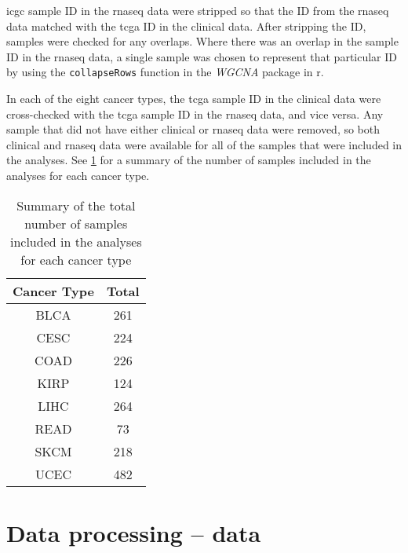 
\gls{icgc} sample ID in the \gls{rnaseq} data were stripped so that the ID from the \gls{rnaseq} data matched with the \gls{tcga} ID in the clinical data.
After stripping the ID, samples were checked for any overlaps.
Where there was an overlap in the sample ID in the \gls{rnaseq} data, a single sample was chosen to represent that particular ID by using the \texttt{collapseRows} function in the \textit{WGCNA} package in \gls{r}.

In each of the eight cancer types, the \gls{tcga} sample ID in the clinical data were cross-checked with the \gls{tcga} sample ID in the \gls{rnaseq} data, and vice versa.
Any sample that did not have either clinical or \gls{rnaseq} data were removed, so both clinical and \gls{rnaseq} data were available for all of the samples that were included in the analyses.
See \cref{tab:samplesize} for a summary of the number of samples included in the analyses for each cancer type.

\begin{table}[h]
	\caption{Summary of the total number of samples included in the analyses for each cancer type}
	\label{tab:samplesize}
	\begin{center}
		\begin{tabular}{cc}
			\textbf{Cancer Type}   & \textbf{Total} \\
			\hline
			\rule{0pt}{2.25ex}BLCA & 261   \\
			CESC                   & 224   \\
			COAD                   & 226   \\
			KIRP                   & 124   \\
			LIHC                   & 264   \\
			READ                   & 73    \\
			SKCM                   & 218   \\
			UCEC                   & 482   \\
		\end{tabular}
	\end{center}
\end{table}

\section{Data processing -- \citet{Creighton2012} data}
\label{sec:dataprocessingcr}


